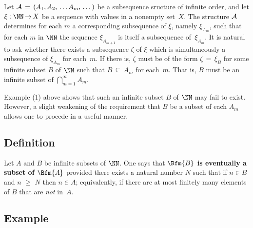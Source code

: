 \VV

        Let ${\cal A} \,=\, (A_{1}, A_{2},\,{\ldots}\,A_{m},\,{\ldots}\,)$ be a subsequence sructure of infinite order,
    and let ${\xi}:{\NN} \,{\rightarrow}\, X$ be a sequence with values in a nonempty set~$X$.
    The structure ${\cal A}$ determines for each $m$ a corresponding subsequence of ${\xi}$, namely ${\xi}_{A_{m}}$,
    such that for each $m$ in ${\NN}$ the sequence ${\xi}_{A_{m+1}}$ is itself a subsequence of~${\xi}_{A_{m}}$.
    It is natural to ask whether there exists a subsequence ${\zeta}$ of ${\xi}$ which is simultaneously a subsequence of ${\xi}_{A_{m}}$ for each~$m$.
    If there is, ${\zeta}$ must be of the form ${\zeta} \,=\, {\xi}_{B}$ for some
    infinite subset $B$ of ${\NN}$ such that $B \,{\subseteq}\, A_{m}$ for each~$m$.
    That is, $B$ must be an infinite subset of $\bigcap_{m=1}^{{\infty}} A_{m}$.

        Example (1) above shows that such an infinite subset $B$ of ${\NN}$ may fail to exist.
    However, a slight weakening of the requirement that $B$ be a subset of each $A_{m}$ allows one to procede in a useful manner.

\V


        \subsection{\small{{\bf Definition}}}
        \label{DefA40.48}

\V

        Let $A$ and $B$ be infinite subsets of ${\NN}$. One says that {\bf $\Bfm{B}$ is eventually a subset of $\Bfm{A}$} 
    provided there exists a natural number $N$ such that if $n{\in}B$ and $n\,\,{\geq}\,\,N$ then $n{\in}A$;
    equivalently, if there are at most finitely many elements of $B$ that are {\em not} in~$A$.

\V


        \subsection{\small{{\bf Example}}}
        \label{ExampA40.50}

\V

